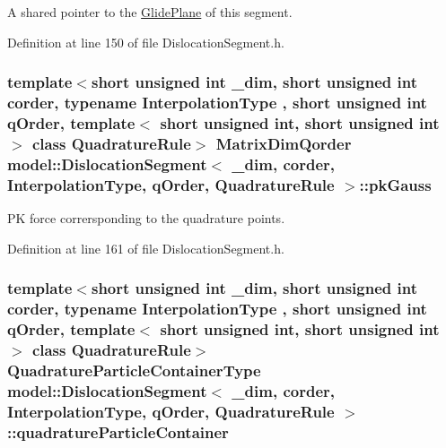 A shared pointer to the \hyperlink{classmodel_1_1_glide_plane}{Glide\+Plane} of this segment. 



Definition at line 150 of file Dislocation\+Segment.\+h.

\hypertarget{classmodel_1_1_dislocation_segment_ab0a6a48cf3cf304c435450caad5442d7}{}
\subsubsection[{pk\+Gauss}]{\setlength{\rightskip}{0pt plus 5cm}template$<$short unsigned int \+\_\+dim, short unsigned int corder, typename Interpolation\+Type , short unsigned int q\+Order, template$<$ short unsigned int, short unsigned int $>$ class Quadrature\+Rule$>$ {\bf Matrix\+Dim\+Qorder} {\bf model\+::\+Dislocation\+Segment}$<$ \+\_\+dim, corder, Interpolation\+Type, q\+Order, Quadrature\+Rule $>$\+::pk\+Gauss}\label{classmodel_1_1_dislocation_segment_ab0a6a48cf3cf304c435450caad5442d7}


P\+K force corrersponding to the quadrature points. 



Definition at line 161 of file Dislocation\+Segment.\+h.

\hypertarget{classmodel_1_1_dislocation_segment_abe35352697b2e7e397955be44cb2d4d1}{}
\subsubsection[{quadrature\+Particle\+Container}]{\setlength{\rightskip}{0pt plus 5cm}template$<$short unsigned int \+\_\+dim, short unsigned int corder, typename Interpolation\+Type , short unsigned int q\+Order, template$<$ short unsigned int, short unsigned int $>$ class Quadrature\+Rule$>$ {\bf Quadrature\+Particle\+Container\+Type} {\bf model\+::\+Dislocation\+Segment}$<$ \+\_\+dim, corder, Interpolation\+Type, q\+Order, Quadrature\+Rule $>$\+::quadrature\+Particle\+Container}\label{classmodel_1_1_dislocation_segment_abe35352697b2e7e397955be44cb2d4d1}


